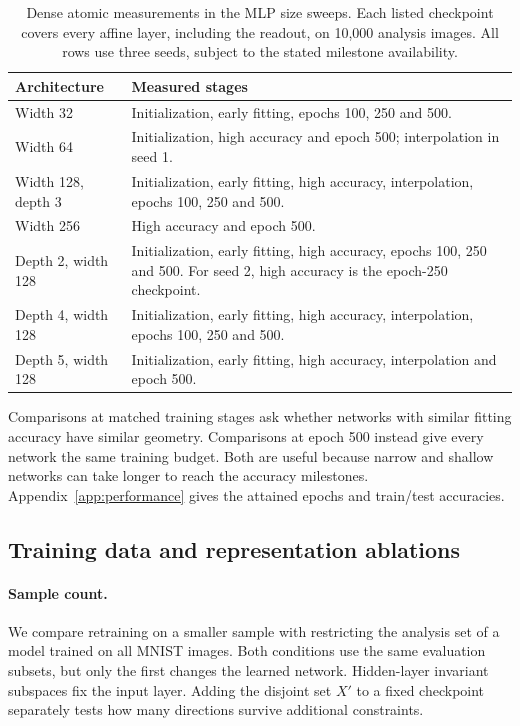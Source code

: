 \begin{table}[!htbp]\centering
\caption{Dense atomic measurements in the MLP size sweeps. Each listed checkpoint covers every affine layer, including the readout, on 10,000 analysis images. All rows use three seeds, subject to the stated milestone availability.}\label{tab:scaling-coverage}
\small\begin{tabular}{p{.23\linewidth}p{.68\linewidth}}\toprule
Architecture & Measured stages\\\midrule
Width 32 & Initialization, early fitting, epochs 100, 250 and 500.\\
Width 64 & Initialization, high accuracy and epoch 500; interpolation in seed 1.\\
Width 128, depth 3 & Initialization, early fitting, high accuracy, interpolation, epochs 100, 250 and 500.\\
Width 256 & High accuracy and epoch 500.\\
Depth 2, width 128 & Initialization, early fitting, high accuracy, epochs 100, 250 and 500. For seed 2, high accuracy is the epoch-250 checkpoint.\\
Depth 4, width 128 & Initialization, early fitting, high accuracy, interpolation, epochs 100, 250 and 500.\\
Depth 5, width 128 & Initialization, early fitting, high accuracy, interpolation and epoch 500.\\\bottomrule
\end{tabular}\end{table}

Comparisons at matched training stages ask whether networks with similar fitting accuracy have similar geometry. Comparisons at epoch 500 instead give every network the same training budget. Both are useful because narrow and shallow networks can take longer to reach the accuracy milestones. Appendix~\ref{app:performance} gives the attained epochs and train/test accuracies.

\subsection{Training data and representation ablations}
\label{app:methods-data}
\paragraph{Sample count.}
We compare retraining on a smaller sample with restricting the analysis set of a model trained on all MNIST images. Both conditions use the same evaluation subsets, but only the first changes the learned network. Hidden-layer invariant subspaces fix the input layer. Adding the disjoint set $X'$ to a fixed checkpoint separately tests how many directions survive additional constraints.

